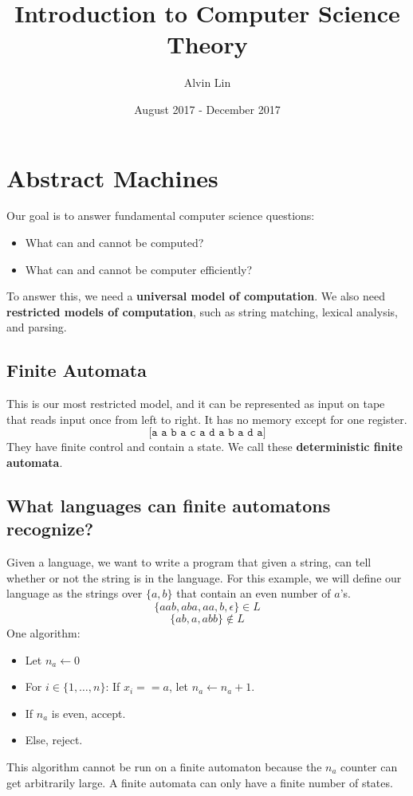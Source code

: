 \documentclass{math}
\title{Introduction to Computer Science Theory}
\author{Alvin Lin}
\date{August 2017 - December 2017}
\begin{document}
\maketitle

\section*{Abstract Machines}
Our goal is to answer fundamental computer science questions:
\begin{itemize}
  \item What can and cannot be computed?
  \item What can and cannot be computer efficiently?
\end{itemize}
To answer this, we need a \textbf{universal model of computation}. We also need
\textbf{restricted models of computation}, such as string matching, lexical
analysis, and parsing.

\subsection*{Finite Automata}
This is our most restricted model, and it can be represented as input on tape
that reads input once from left to right. It has no memory except for one
register.
\[ \texttt{[a a b a c a d a b a d a]} \]
They have finite control and contain a state. We call these
\textbf{deterministic finite automata}.

\subsection*{What languages can finite automatons recognize?}
Given a language, we want to write a program that given a string, can tell
whether or not the string is in the language. For this example, we will define
our language as the strings over \( \{a,b\} \) that contain an even number of
\( a \)'s.
\[ \{aab,aba,aa,b,\epsilon\}\in L \]
\[ \{ab,a,abb\}\notin L \]
One algorithm:
\begin{itemize}
  \item Let \( n_a \leftarrow 0 \)
  \item For \( i\in\{1,\dots,n\} \): If \( x_i == a \), let \( n_a\leftarrow
  n_a+1 \).
  \item If \( n_a \) is even, accept.
  \item Else, reject.
\end{itemize}
This algorithm cannot be run on a finite automaton because the \( n_a \)
counter can get arbitrarily large. A finite automata can only have a finite
number of states.
\end{document}
